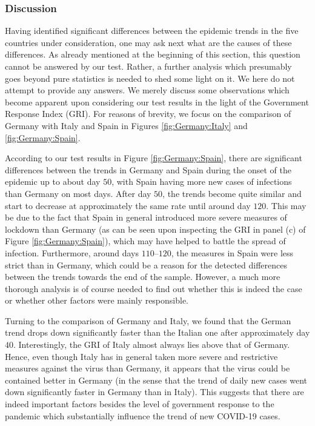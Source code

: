 \documentclass[a4paper,12pt]{article}
\numberwithin{equation}{section}
\begin{document}


\subsubsection{Discussion}


Having identified significant differences between the epidemic trends in the five countries under consideration, one may ask next what are the causes of these differences. As already mentioned at the beginning of this section, this question cannot be answered by our test. Rather, a further analysis which presumably goes beyond pure statistics is needed to shed some light on it. We here do not attempt to provide any answers. We merely discuss some observations which become apparent upon considering our test results in the light of the Government Response Index (GRI). For reasons of brevity, we focus on the comparison of Germany with Italy and Spain in Figures \ref{fig:Germany:Italy} and \ref{fig:Germany:Spain}. 


According to our test results in Figure \ref{fig:Germany:Spain}, there are significant differences between the trends in Germany and Spain during the onset of the epidemic up to about day $50$, with Spain having more new cases of infections than Germany on most days. After day $50$, the trends become quite similar and start to decrease at approximately the same rate {\color{red}until around day $120$}. This may be due to the fact that Spain in general introduced more severe measures of lockdown than Germany (as can be seen upon inspecting the GRI in panel (c) of Figure \ref{fig:Germany:Spain}), which may have helped to battle the spread of infection. {\color{red} Furthermore, around days $110$--$120$, the measures in Spain were less strict than in Germany, which could be a reason for the detected differences between the trends towards the end of the sample.} However, a much more thorough analysis is of course needed to find out whether this is indeed the case or whether other factors were mainly responsible. 

Turning to the comparison of Germany and Italy, we found that the German trend drops down significantly faster than the Italian one after approximately day $40$. Interestingly, the GRI of Italy almost always lies above that of Germany. Hence, even though Italy has in general taken more severe and restrictive measures against the virus than Germany, it appears that the virus could be contained better in Germany (in the sense that the trend of daily new cases went down significantly faster in Germany than in Italy). This suggests that there are indeed important factors besides the level of government response to the pandemic which substantially influence the trend of new COVID-19 cases. 
\end{document}
